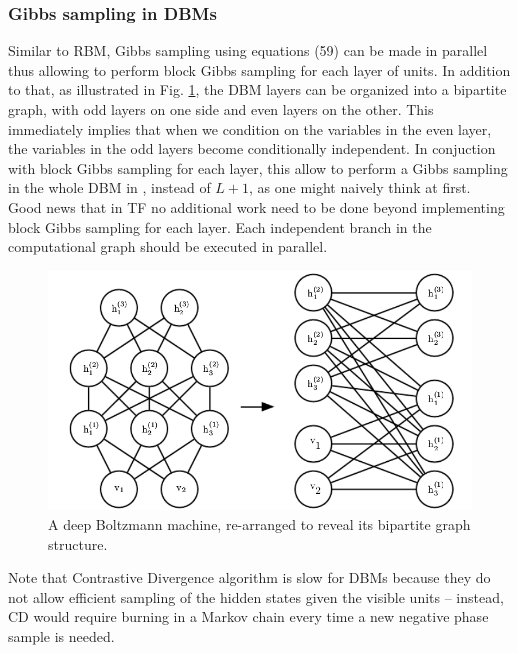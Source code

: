 \subsubsection{Gibbs sampling in DBMs}
\textbullet{} Similar to RBM, Gibbs sampling using equations (59) can be made in parallel thus allowing to perform block Gibbs sampling for each layer of units. In addition to that, as illustrated in Fig. \ref{fig:dbm_gibbs}, the DBM layers
can be organized into a bipartite graph, with odd layers on one side and even layers
on the other. This immediately implies that when we condition on the variables in
the even layer, the variables in the odd layers become conditionally independent. In conjuction with block Gibbs sampling for each layer, this allow to perform a Gibbs sampling in the whole DBM in , instead of $L + 1$, as one might naively think at first.
\\
\textbullet{} Good news that in TF no additional work need to be done beyond implementing block Gibbs sampling for each layer. Each independent branch in the computational graph should be executed in parallel.
\begin{figure}[h]
\begin{mdframed}
\includegraphics[scale=0.4]{img/dbm_gibbs.png}
\centering
\caption{A deep Boltzmann machine, re-arranged to reveal its bipartite graph structure.}
\label{fig:dbm_gibbs}
\end{mdframed}
\end{figure}
\textbullet{} Note that Contrastive Divergence algorithm is slow for DBMs because they do not allow efficient sampling of the hidden states given the visible units -- instead, CD would require burning in a Markov chain every time a new negative phase sample is needed.
